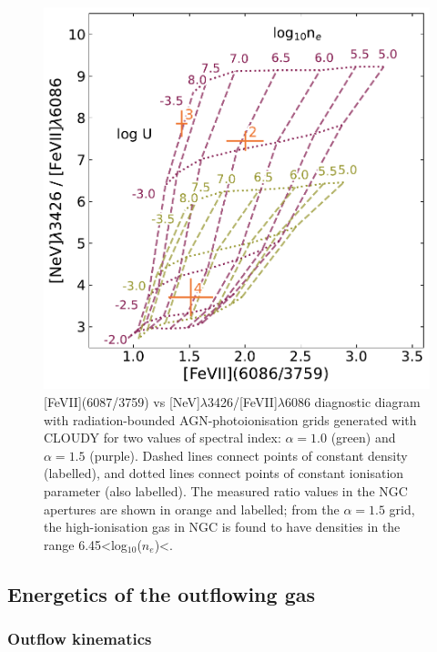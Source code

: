 \begin{figure}[!ht]
    \centering
    \includegraphics[width=0.7\linewidth]{figures/stis_seyferts/nev_fevii_vary_a.pdf}
    \caption[{[}FeVII{]}(6087/3759) vs {[}NeV{]}$\lambda$3426/{[}FeVII{]}$\lambda$6086 diagnostic diagram for the highly-ionised gas in NGC, along with grids produced from photoionisation modelling.]{[FeVII](6087/3759) vs [NeV]$\lambda$3426/[FeVII]$\lambda$6086 diagnostic diagram with radiation-bounded AGN-photoionisation grids generated with \textsc{CLOUDY} for two values of spectral index: $\alpha=1.0$ (green) and $\alpha=1.5$ (purple). Dashed lines connect points of constant density (labelled), and dotted lines connect points of constant ionisation parameter (also labelled). The measured ratio values in the NGC apertures are shown in orange and labelled; from the $\alpha=1.5$ grid, the high-ionisation gas in NGC is found to have densities in the range 6.45\;\textless\;log$_{10}$($n_e$\;[cm$^{-3}$])\;\textless{}.}
    \label{fig: stis_seyferts: nev_fevii_a_vary}
\end{figure}

\vspace*{\fill}

\newpage
\subsection{Energetics of the outflowing gas}
\label{section: stis_seyferts: energetics}

\subsubsection{Outflow kinematics}
\label{section: stis_seyferts: kinematics}

